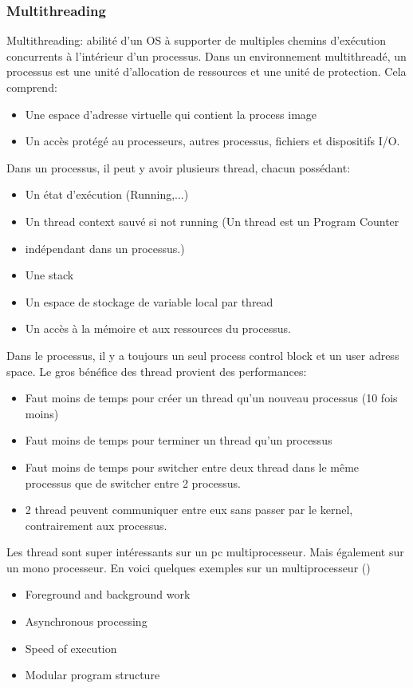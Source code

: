 \subsubsection{Multithreading}
Multithreading: abilité d'un OS à supporter de multiples chemins d'exécution concurrents à l'intérieur d'un processus. Dans un environnement multithreadé, un processus est une unité d'allocation de ressources et une unité de protection. Cela comprend:
\begin{itemize}
  \item Une espace d'adresse virtuelle qui contient la process image
  \item Un accès protégé au processeurs, autres processus, fichiers et dispositifs I/O.
\end{itemize}
Dans un processus, il peut y avoir plusieurs thread, chacun possédant:
\begin{itemize}
  \item Un état d'exécution (Running,...)
  \item Un thread context sauvé si not running (Un thread est un Program Counter
  \item indépendant dans un processus.)
  \item Une stack
  \item Un espace de stockage de variable local par thread
  \item Un accès à la mémoire et aux ressources du processus.
\end{itemize}
Dans le processus, il y a toujours un seul process control block et un user adress space. Le gros bénéfice des thread provient des performances:
\begin{itemize}
  \item Faut moins de temps pour créer un thread qu'un nouveau processus (10 fois moins)
  \item Faut moins de temps pour terminer un thread qu'un processus
  \item Faut moins de temps pour switcher entre deux thread dans le même processus que de switcher entre 2 processus.
  \item 2 thread peuvent communiquer entre eux sans passer par le kernel, contrairement aux processus.
\end{itemize}
Les thread sont super intéressants sur un pc multiprocesseur. Mais également sur un mono processeur. En voici quelques exemples sur un multiprocesseur (\cite[p.~181]{stallings})
\begin{itemize}
  \item Foreground and background work
  \item Asynchronous processing
  \item Speed of execution
  \item Modular program structure
\end{itemize}

